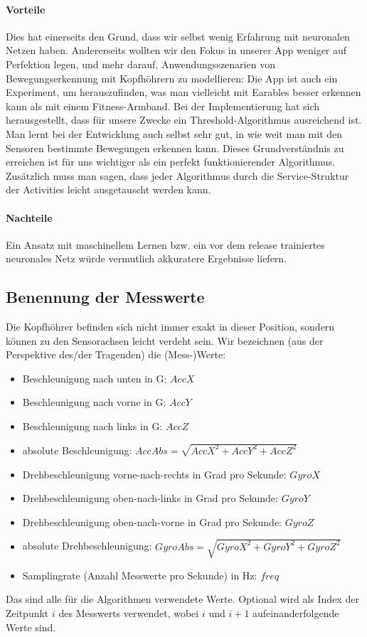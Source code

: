 \documentclass[a4paper,12pt]{article}
\begin{document}
\paragraph{Vorteile}
Dies hat einerseits den Grund, dass wir selbst wenig Erfahrung mit neuronalen Netzen haben. Andererseits wollten wir den Fokus in unserer App weniger auf Perfektion legen, und mehr darauf, Anwendungsszenarien von Bewegungserkennung mit Kopfhöhrern zu modellieren: Die App ist auch ein Experiment, um herauszufinden, was man vielleicht mit Earables besser erkennen kann als mit einem Fitness-Armband. Bei der Implementierung hat sich herausgestellt, dass für unsere Zwecke ein Threshold-Algorithmus ausreichend ist. Man lernt bei der Entwicklung auch selbst sehr gut, in wie weit man mit den Sensoren bestimmte Bewegungen erkennen kann. Dieses Grundverständnis zu erreichen ist für uns wichtiger als ein perfekt funktionierender Algorithmus.\\
Zusätzlich muss man sagen, dass jeder Algorithmus durch die Service-Struktur der Activities leicht ausgetauscht werden kann.
\paragraph{Nachteile}
Ein Ansatz mit maschinellem Lernen bzw. ein vor dem release trainiertes neuronales Netz würde vermutlich akkuratere Ergebnisse liefern. 
\subsection{Benennung der Messwerte}
Die Kopfhöhrer befinden sich nicht immer exakt in dieser Position, sondern können zu den Sensorachsen leicht verdeht sein. Wir bezeichnen (aus der Perspektive des/der Tragenden) die (Mess-)Werte:
\begin{itemize}
	\item Beschleunigung nach unten in G: $AccX$
	\item Beschleunigung nach vorne in G: $AccY$
	\item Beschleunigung nach links in G: $AccZ$
	\item absolute Beschleunigung: $AccAbs = \sqrt{AccX^2+AccY^2+AccZ^2}$
	\item Drehbeschleunigung vorne-nach-rechts in Grad pro Sekunde: $GyroX$ 
	\item Drehbeschleunigung oben-nach-links in Grad pro Sekunde: $GyroY$ 
	\item Drehbeschleunigung oben-nach-vorne in Grad pro Sekunde: $GyroZ$ 
	\item absolute Drehbeschleunigung: $GyroAbs = \sqrt{GyroX^2+GyroY^2+GyroZ^2}$
	\item Samplingrate (Anzahl Messwerte pro Sekunde) in Hz: $freq$
\end{itemize}
Das sind alle für die Algorithmen verwendete Werte. Optional wird als Index der Zeitpunkt $i$ des Messwerts verwendet, wobei $i$ und $i+1$ aufeinanderfolgende Werte sind.
\end{document}
